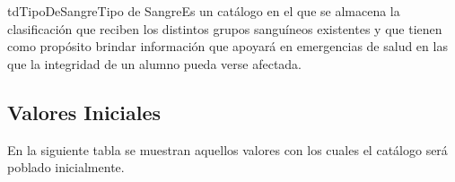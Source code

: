 \begin{TipoDeDato}{tdTipoDeSangre}{Tipo de Sangre}{Es un catálogo en el que se almacena la clasificación que reciben los distintos grupos sanguíneos existentes y que tienen como propósito brindar información que apoyará en emergencias de salud en las que la integridad de un alumno pueda verse afectada.}
	
	\begin{tdAtributos}
		
		
	
	\end{tdAtributos}
	
	\subsection{Valores Iniciales}
  En la siguiente tabla se muestran aquellos valores con los cuales el catálogo será poblado inicialmente. \cdtEmpty


\end{TipoDeDato}
